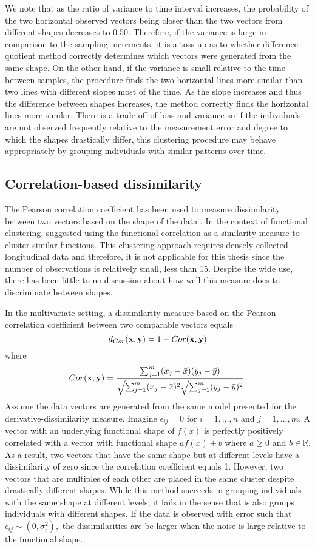 We note that as the ratio of variance to time interval increases, the probability of the two horizontal observed vectors being closer than the two vectors from different shapes decreases to 0.50. Therefore, if the variance is large in comparison to the sampling increments, it is a toss up as to whether difference quotient method correctly determines which vectors were generated from the same shape. On the other hand, if the variance is small relative to the time between samples, the procedure finds the two horizontal lines more similar than two lines with different slopes most of the time. As the slope increases and thus the difference between shapes increases, the method correctly finds the horizontal lines more similar. There is a trade off of bias and variance so if the individuals are not observed frequently relative to the measurement error and degree to which the shapes drastically differ, this clustering procedure may behave appropriately by grouping individuals with similar patterns over time. 

\subsection{Correlation-based dissimilarity}
The Pearson correlation coefficient has been used to measure dissimilarity between two vectors based on the shape of the data  \cite{chouakria2007,  eisen1998, chiou2008}. In the context of functional clustering, \textcite{chiou2008} suggested using the functional correlation as a similarity measure to cluster similar functions. This clustering approach requires densely collected longitudinal data and therefore, it is not applicable for this thesis since the number of observations is relatively small, less than 15. Despite the wide use, there has been little to no discussion about how well this measure does to discriminate between shapes.

In the multivariate setting, a dissimilarity measure based on the Pearson correlation coefficient between two comparable vectors equals 
$$d_{Cor}(\mathbf x,\mathbf y) = 1-Cor(\mathbf x,\mathbf y)$$ 
where $$Cor(\mathbf x,\mathbf y) = \frac{\sum^{m}_{j=1}(x_{j}-\bar{x})(y_{j}-\bar{y})}{\sqrt{\sum^{m}_{j=1}(x_{j}-\bar{x})^{2}}\sqrt{\sum^{m}_{j=1}(y_{j}-\bar{y})^{2}}}.$$
Assume the data vectors are generated from the same model presented for the derivative-dissimilarity measure. Imagine $\epsilon_{ij}=0$ for $i=1,...,n$ and $j=1,...,m$. A vector with an underlying functional shape of $f(x)$ is perfectly positively correlated with a vector with functional shape $af(x) + b$ where $a\geq0$ and $b\in\mathbb{R}$. As a result, two vectors that have the same shape but at different levels have a dissimilarity of zero since the correlation coefficient equals 1. However, two vectors that are multiples of each other are placed in the same cluster despite drastically different shapes. While this method succeeds in grouping individuals with the same shape at different levels, it fails in the sense that is also groups individuals with different shapes. If the data is observed with error such that $\epsilon_{ij}\sim(0,\sigma_{i}^{2}),$ the dissimilarities are be larger when the noise is large relative to the functional shape. 

